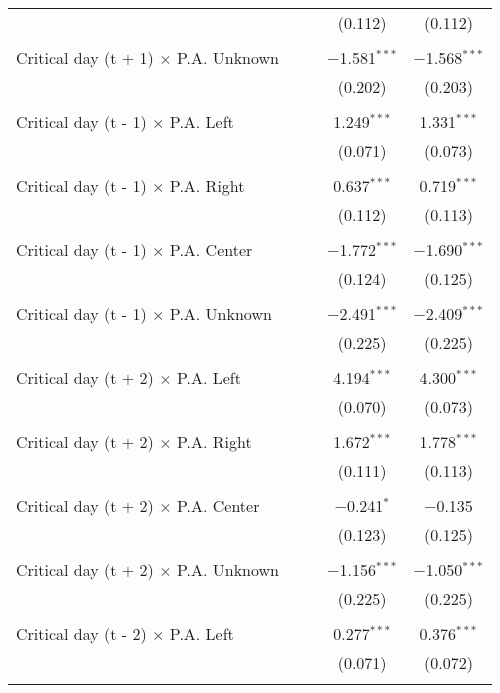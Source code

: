 \documentclass[
]{article}
\begin{document}
\begin{table}[!htbp]
{\begin{tabular}{@{\extracolsep{5pt}}lcccc}
  &  &  & (0.112) & (0.112) \\ 
  & & & & \\ 
 Critical day (t + 1) $\times$ P.A. Unknown &  &  & $-$1.581$^{***}$ & $-$1.568$^{***}$ \\ 
  &  &  & (0.202) & (0.203) \\ 
  & & & & \\ 
 Critical day (t - 1) $\times$ P.A. Left &  &  & 1.249$^{***}$ & 1.331$^{***}$ \\ 
  &  &  & (0.071) & (0.073) \\ 
  & & & & \\ 
 Critical day (t - 1) $\times$ P.A. Right &  &  & 0.637$^{***}$ & 0.719$^{***}$ \\ 
  &  &  & (0.112) & (0.113) \\ 
  & & & & \\ 
 Critical day (t - 1) $\times$ P.A. Center &  &  & $-$1.772$^{***}$ & $-$1.690$^{***}$ \\ 
  &  &  & (0.124) & (0.125) \\ 
  & & & & \\ 
 Critical day (t - 1) $\times$ P.A. Unknown &  &  & $-$2.491$^{***}$ & $-$2.409$^{***}$ \\ 
  &  &  & (0.225) & (0.225) \\ 
  & & & & \\ 
 Critical day (t + 2) $\times$ P.A. Left &  &  & 4.194$^{***}$ & 4.300$^{***}$ \\ 
  &  &  & (0.070) & (0.073) \\ 
  & & & & \\ 
 Critical day (t + 2) $\times$ P.A. Right &  &  & 1.672$^{***}$ & 1.778$^{***}$ \\ 
  &  &  & (0.111) & (0.113) \\ 
  & & & & \\ 
 Critical day (t + 2) $\times$ P.A. Center &  &  & $-$0.241$^{*}$ & $-$0.135 \\ 
  &  &  & (0.123) & (0.125) \\ 
  & & & & \\ 
 Critical day (t + 2) $\times$ P.A. Unknown &  &  & $-$1.156$^{***}$ & $-$1.050$^{***}$ \\ 
  &  &  & (0.225) & (0.225) \\ 
  & & & & \\ 
 Critical day (t - 2) $\times$ P.A. Left &  &  & 0.277$^{***}$ & 0.376$^{***}$ \\ 
  &  &  & (0.071) & (0.072) \\ 
  & & & & \\ 

\end{tabular}}
\end{table}
\end{document}
